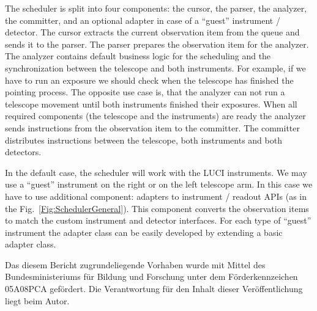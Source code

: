 The scheduler is split into four components: the cursor, the parser, the analyzer, the committer, and an optional adapter in 
case of a ``guest'' instrument / detector. 
The cursor extracts the current observation item from the queue and sends it to the parser. The parser prepares the observation item
for the analyzer. The analyzer contains default business logic for the scheduling and the synchronization between the telescope and 
both instruments. For example, if we have to run an exposure we should check when the telescope has finished the pointing process.  
The opposite use case is, that the analyzer can not run a telescope movement until both instruments finished their exposures.
When all required components (the telescope and the instruments) are ready the analyzer sends instructions from the observation item to the committer.
The committer distributes instructions between the telescope, both instruments and both detectors.  

In the default case, the scheduler will work with the LUCI instruments. We may use a ``guest'' instrument on the right or on the left telescope arm.
In this case we have to use additional component: adapters to instrument / readout APIs (as in the Fig.~\ref{Fig:SchedulerGeneral}). 
This component converts the observation items to match the custom instrument and detector interfaces. 
For each type of ``guest'' instrument the adapter class can be easily developed by extending a basic adapter class.

\acknowledgements 
Das diesem Bericht zugrundeliegende Vorhaben wurde mit Mittel des Bundesministeriums f\"ur Bildung und Forschung unter dem F\"orderkennzeichen 05A08PCA gef\"ordert. Die Verantwortung f\"ur den Inhalt dieser Ver\"offentlichung liegt beim Autor.


